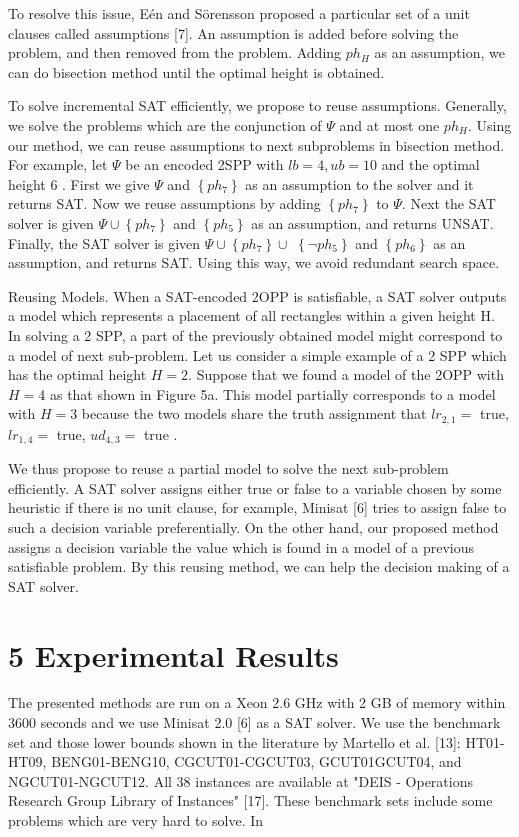 \documentclass[10pt]{article}
\begin{document}
To resolve this issue, Eén and Sörensson proposed a particular set of a unit clauses called assumptions [7]. An assumption is added before solving the problem, and then removed from the problem. Adding $p h_{H}$ as an assumption, we can do bisection method until the optimal height is obtained.

To solve incremental SAT efficiently, we propose to reuse assumptions. Generally, we solve the problems which are the conjunction of $\Psi$ and at most one $p h_{H}$. Using our method, we can reuse assumptions to next subproblems in bisection method. For example, let $\Psi$ be an encoded 2SPP with $l b=4, u b=10$ and the optimal height 6 . First we give $\Psi$ and $\left\{p h_{7}\right\}$ as an assumption to the solver and it returns SAT. Now we reuse assumptions by adding $\left\{p h_{7}\right\}$ to $\Psi$. Next the SAT solver is given $\Psi \cup\left\{p h_{7}\right\}$ and $\left\{p h_{5}\right\}$ as an assumption, and returns UNSAT. Finally, the SAT solver is given $\Psi \cup\left\{p h_{7}\right\} \cup$ $\left\{\neg p h_{5}\right\}$ and $\left\{p h_{6}\right\}$ as an assumption, and returns SAT. Using this way, we avoid redundant search space.

Reusing Models. When a SAT-encoded 2OPP is satisfiable, a SAT solver outputs a model which represents a placement of all rectangles within a given height H. In solving a 2 SPP, a part of the previously obtained model might correspond to a model of next sub-problem. Let us consider a simple example of a 2 SPP which has the optimal height $H=2$. Suppose that we found a model of the 2OPP with $H=4$ as that shown in Figure 5a. This model partially corresponds to a model with $H=3$ because the two models share the truth assignment that $l r_{2,1}=$ true, $l r_{1,4}=$ true, $u d_{4,3}=$ true .

We thus propose to reuse a partial model to solve the next sub-problem efficiently. A SAT solver assigns either true or false to a variable chosen by some heuristic if there is no unit clause, for example, Minisat [6] tries to assign false to such a decision variable preferentially. On the other hand, our proposed method assigns a decision variable the value which is found in a model of a previous satisfiable problem. By this reusing method, we can help the decision making of a SAT solver.

\section*{5 Experimental Results}
The presented methods are run on a Xeon 2.6 GHz with 2 GB of memory within 3600 seconds and we use Minisat 2.0 [6] as a SAT solver. We use the benchmark set and those lower bounds shown in the literature by Martello et al. [13]: HT01-HT09, BENG01-BENG10, CGCUT01-CGCUT03, GCUT01GCUT04, and NGCUT01-NGCUT12. All 38 instances are available at "DEIS - Operations Research Group Library of Instances" [17]. These benchmark sets include some problems which are very hard to solve. In
\end{document}

